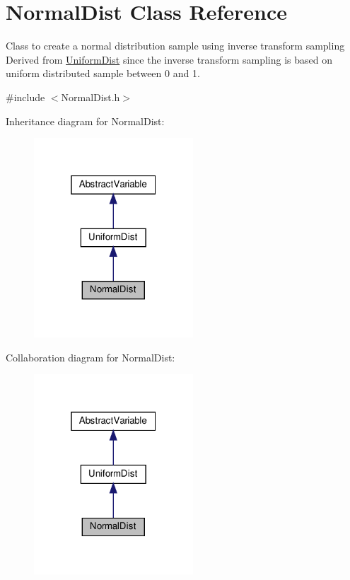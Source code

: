 \hypertarget{classNormalDist}{}\section{Normal\+Dist Class Reference}
\label{classNormalDist}


Class to create a normal distribution sample using inverse transform sampling Derived from \hyperlink{classUniformDist}{Uniform\+Dist} since the inverse transform sampling is based on uniform distributed sample between 0 and 1.  




{\ttfamily \#include $<$Normal\+Dist.\+h$>$}



Inheritance diagram for Normal\+Dist\+:\nopagebreak
\begin{figure}[H]
\begin{center}
\leavevmode
\includegraphics[width=169pt]{classNormalDist__inherit__graph}
\end{center}
\end{figure}


Collaboration diagram for Normal\+Dist\+:\nopagebreak
\begin{figure}[H]
\begin{center}
\leavevmode
\includegraphics[width=169pt]{classNormalDist__coll__graph}
\end{center}
\end{figure}
